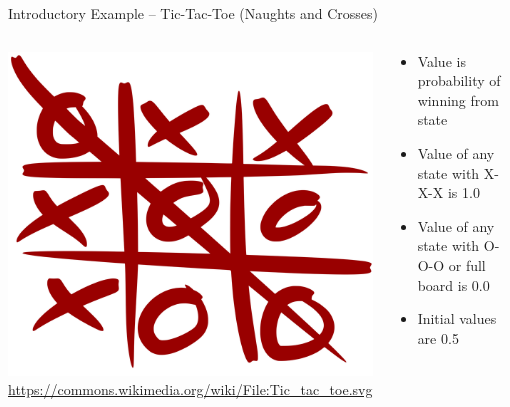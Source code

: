 \documentclass[ignorenonframetext,xcolor=x11names]{beamer}
\begin{document}
\begin{frame}{Introductory Example -- Tic-Tac-Toe \small(Naughts and Crosses)}
\begin{columns}
\begin{column}{0.25\textwidth}
\includegraphics[width=\textwidth]{Tic_tac_toe.png} \\
\vspace{\baselineskip}
\scriptsize \url{https://commons.wikimedia.org/wiki/File:Tic_tac_toe.svg}
\end{column}
\begin{column}{0.75\textwidth}
\begin{itemize}
  \item Value is probability of winning from state
  \item Value of any state with X-X-X is 1.0
  \item Value of any state with O-O-O or full board is 0.0
  \item Initial values are 0.5
\end{itemize}
\end{column}
\end{columns}
\end{frame}
\end{document}
